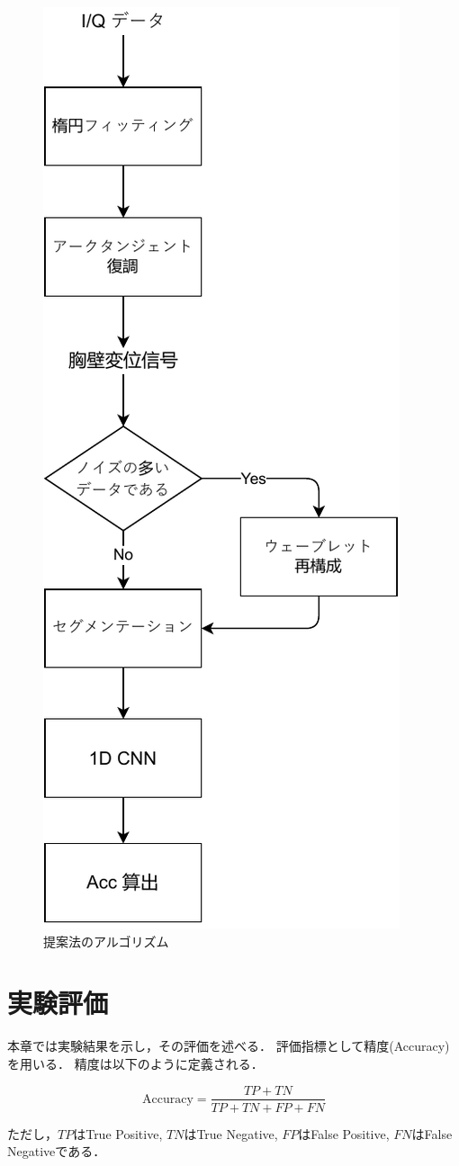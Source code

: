 \begin{figure}[H]
\begin{center}
\includegraphics[width=0.5\linewidth]{./fig/proposed_method.pdf}
\end{center}
\caption{提案法のアルゴリズム}
\label{fig:proposed_method}
\end{figure}

\chapter{実験評価}
本章では実験結果を示し，その評価を述べる．
評価指標として精度(Accuracy)を用いる．
精度は以下のように定義される．

\begin{equation}\label{}
\mathrm{Accuracy} = \frac{TP + TN}{TP + TN + FP + FN}
\end{equation}

ただし，$TP$はTrue Positive, $TN$はTrue Negative, $FP$はFalse Positive, $FN$はFalse Negativeである．

